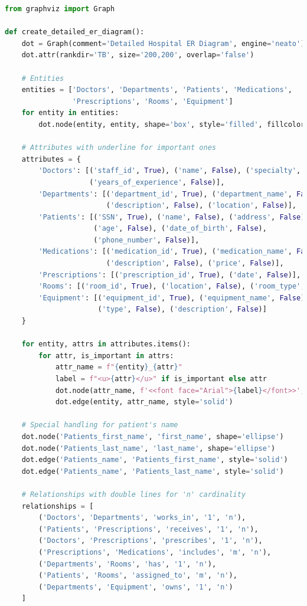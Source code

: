 \documentclass{article}
\begin{document}
\begin{lstlisting}[language=Python, caption=Python code for generating the ER diagram]
from graphviz import Graph

def create_detailed_er_diagram():
    dot = Graph(comment='Detailed Hospital ER Diagram', engine='neato')
    dot.attr(rankdir='TB', size='200,200', overlap='false')

    # Entities
    entities = ['Doctors', 'Departments', 'Patients', 'Medications', 
                'Prescriptions', 'Rooms', 'Equipment']
    for entity in entities:
        dot.node(entity, entity, shape='box', style='filled', fillcolor='lightblue')

    # Attributes with underline for important ones
    attributes = {
        'Doctors': [('staff_id', True), ('name', False), ('specialty', False), 
                    ('years_of_experience', False)],
        'Departments': [('department_id', True), ('department_name', False), 
                        ('description', False), ('location', False)],
        'Patients': [('SSN', True), ('name', False), ('address', False), 
                     ('age', False), ('date_of_birth', False), 
                     ('phone_number', False)],
        'Medications': [('medication_id', True), ('medication_name', False), 
                        ('description', False), ('price', False)],
        'Prescriptions': [('prescription_id', True), ('date', False)],
        'Rooms': [('room_id', True), ('location', False), ('room_type', False)],
        'Equipment': [('equipment_id', True), ('equipment_name', False), 
                      ('type', False), ('description', False)]
    }

    for entity, attrs in attributes.items():
        for attr, is_important in attrs:
            attr_name = f"{entity}_{attr}"
            label = f"<u>{attr}</u>" if is_important else attr
            dot.node(attr_name, f'<<font face="Arial">{label}</font>>', shape='ellipse')
            dot.edge(entity, attr_name, style='solid')

    # Special handling for patient's name
    dot.node('Patients_first_name', 'first_name', shape='ellipse')
    dot.node('Patients_last_name', 'last_name', shape='ellipse')
    dot.edge('Patients_name', 'Patients_first_name', style='solid')
    dot.edge('Patients_name', 'Patients_last_name', style='solid')

    # Relationships with double lines for 'n' cardinality
    relationships = [
        ('Doctors', 'Departments', 'works_in', '1', 'n'),
        ('Patients', 'Prescriptions', 'receives', '1', 'n'),
        ('Doctors', 'Prescriptions', 'prescribes', '1', 'n'),
        ('Prescriptions', 'Medications', 'includes', 'm', 'n'),
        ('Departments', 'Rooms', 'has', '1', 'n'),
        ('Patients', 'Rooms', 'assigned_to', 'm', 'n'),
        ('Departments', 'Equipment', 'owns', '1', 'n')
    ]


\end{lstlisting}
\end{document}
